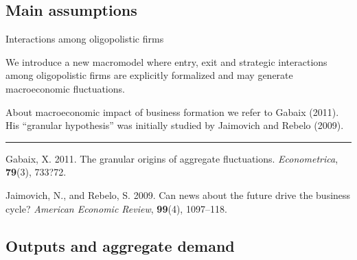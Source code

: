 \documentclass[9pt]{beamer}
\begin{document}
\subsection{Main assumptions}

\begin{frame}{Interactions among oligopolistic firms}

We introduce a new macromodel where entry, exit and strategic interactions among oligopolistic firms are explicitly formalized and may generate macroeconomic fluctuations. 

About macroeconomic impact of business formation we refer to Gabaix (2011). His ``granular hypothesis'' was initially studied by Jaimovich and Rebelo (2009). 

\bigskip
\bigskip
\bigskip
\bigskip
\bigskip


\noindent\rule{8cm}{0.4pt}
\scriptsize


Gabaix, X. 2011. The granular origins of aggregate fluctuations. \emph{Econometrica}, \textbf{79}(3), 733?72.

Jaimovich, N., and Rebelo, S. 2009. Can news about the future drive the
business cycle? \emph{American Economic Review}, \textbf{99}(4), 1097--118.

\end{frame}

\subsection{Outputs and aggregate demand}
\end{document}
